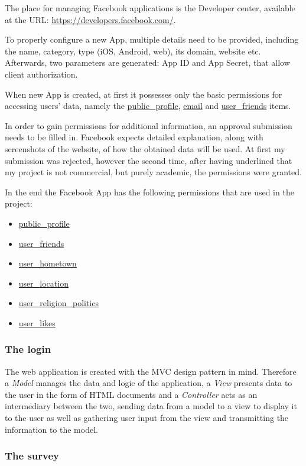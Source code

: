 \documentclass[12pt]{report}
\begin{document}
The place for managing Facebook applications is the Developer center, available at the URL: \url{https://developers.facebook.com/}.

To properly configure a new App, multiple details need to be provided, including the name, category, type (iOS, Android, web), its domain, website etc. Afterwards, two parameters are generated: App ID and App Secret, that allow client authorization.

When new App is created, at first it possesses only the basic permissions for accessing users' data, namely the \url{public_profile}, \url{email} and \url{user_friends} items.

In order to gain permissions for additional information, an approval submission needs to be filled in. Facebook expects detailed explanation, along with screenshots of the website, of how the obtained data will be used. At first my submission was rejected, however the second time, after having underlined that my project is not commercial, but purely academic, the permissions were granted.

In the end the Facebook App has the following permissions that are used in the project:
\begin{itemize}
\item \url{public_profile}
\item \url{user_friends}
\item \url{user_hometown}
\item \url{user_location}
\item \url{user_religion_politics}
\item \url{user_likes}
\end{itemize}

\subsubsection{The login}

The web application is created with the MVC design pattern in mind. Therefore a \textit{Model} manages the data and logic of the application, a \textit{View} presents data to the user in the form of HTML documents and a \textit{Controller} acts as an intermediary between the two, sending data from a model to a view to display it to the user as well as gathering user input from the view and transmitting the information to the model.



\subsubsection{The survey}
\end{document}

